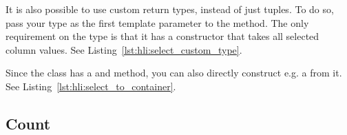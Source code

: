 
It is also possible to use custom return types, instead of just tuples. To do so, pass your type as the first template parameter to the  method. The only requirement on the type is that it has a constructor that takes all selected column values. See Listing~\ref{lst:hli:select_custom_type}.



Since the  class has a  and  method, you can also directly construct e.g. a  from it. See Listing~\ref{lst:hli:select_to_container}.







\subsection{Count}
\label{section:hli:count}
